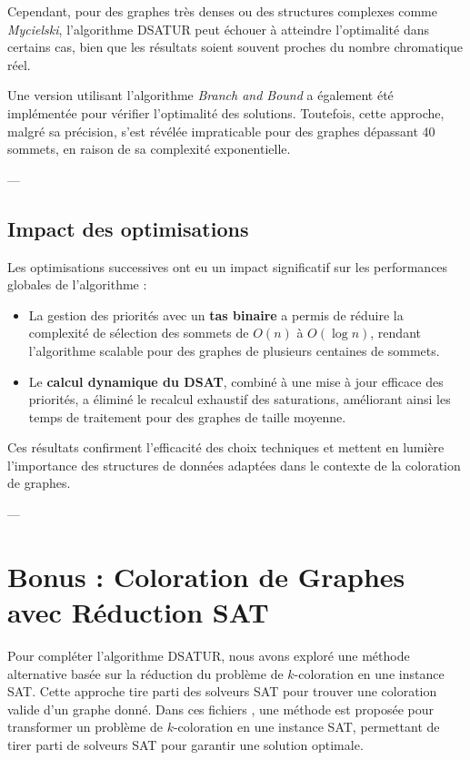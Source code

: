 \documentclass[11pt]{article}
\begin{document}
Cependant, pour des graphes très denses ou des structures complexes comme \textit{Mycielski}, l’algorithme DSATUR peut échouer à atteindre l’optimalité dans certains cas, bien que les résultats soient souvent proches du nombre chromatique réel.

Une version utilisant l’algorithme \textit{Branch and Bound} a également été implémentée pour vérifier l'optimalité des solutions. Toutefois, cette approche, malgré sa précision, s’est révélée impraticable pour des graphes dépassant 40 sommets, en raison de sa complexité exponentielle.

---

\subsection{Impact des optimisations}

Les optimisations successives ont eu un impact significatif sur les performances globales de l’algorithme :
\begin{itemize}
    \item La gestion des priorités avec un \textbf{tas binaire} a permis de réduire la complexité de sélection des sommets de \( O(n) \) à \( O(\log n) \), rendant l’algorithme scalable pour des graphes de plusieurs centaines de sommets.
    \item Le \textbf{calcul dynamique du DSAT}, combiné à une mise à jour efficace des priorités, a éliminé le recalcul exhaustif des saturations, améliorant ainsi les temps de traitement pour des graphes de taille moyenne.
\end{itemize}

Ces résultats confirment l’efficacité des choix techniques et mettent en lumière l’importance des structures de données adaptées dans le contexte de la coloration de graphes.

---

\section{Bonus : Coloration de Graphes avec Réduction SAT}

Pour compléter l'algorithme DSATUR, nous avons exploré une méthode alternative basée sur la réduction du problème de \(k\)-coloration en une instance SAT. Cette approche tire parti des solveurs SAT pour trouver une coloration valide d'un graphe donné.
Dans ces fichiers \cite{k_coloring_sat} \cite{coloring_course}, une méthode est proposée pour transformer un problème de \(k\)-coloration en une instance SAT, permettant de tirer parti de solveurs SAT pour garantir une solution optimale.
\end{document}

